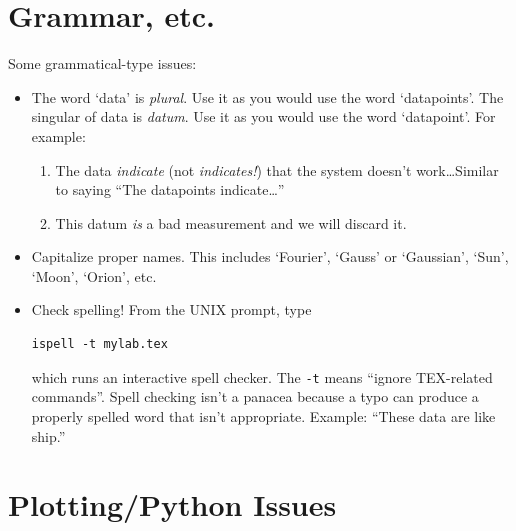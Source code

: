 \documentclass[12pt,preprint]{aastex}
\begin{document}
\section{ Grammar, etc.}

	Some grammatical-type issues: \begin{itemize}

	\item The word `data' is {\it plural}. Use it as you would use
the word `datapoints'. The singular of data is {\it datum}. Use it as
you would use the word `datapoint'. For example: \begin{enumerate}

	\item The data {\it indicate} (not {\it indicates!}) that the
system doesn't work\dots Similar to saying ``The datapoints
indicate\dots''

	\item This datum {\it is} a bad measurement and we will discard
it.  
\end{enumerate}

	\item Capitalize proper names. This includes `Fourier', `Gauss'
or `Gaussian', `Sun', `Moon', `Orion', etc.

	\item Check spelling! From the UNIX prompt, type

\begin{verbatim}
ispell -t mylab.tex
\end{verbatim}

\noindent which runs an interactive spell checker. The \verb$-t$ means
``ignore TEX-related commands''. Spell checking isn't a panacea because a
typo can produce a properly spelled word that isn't appropriate.
Example: ``These data are like ship.''

\end{itemize}

\section{ Plotting/Python Issues} \label{plotting}
\end{document}
